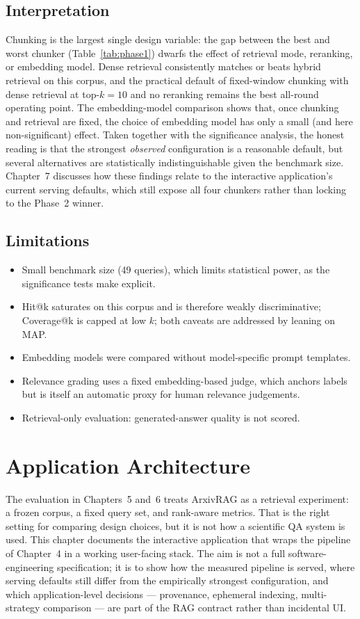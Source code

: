 \documentclass[12pt,a4paper,titlepage,oneside]{book}
\begin{document}
\section{Interpretation}
Chunking is the largest single design variable: the gap between the best and worst chunker (Table~\ref{tab:phase1}) dwarfs the effect of retrieval mode, reranking, or embedding model. Dense retrieval consistently matches or beats hybrid retrieval on this corpus, and the practical default of fixed-window chunking with dense retrieval at top-$k=10$ and no reranking remains the best all-round operating point. The embedding-model comparison shows that, once chunking and retrieval are fixed, the choice of embedding model has only a small (and here non-significant) effect. Taken together with the significance analysis, the honest reading is that the strongest \emph{observed} configuration is a reasonable default, but several alternatives are statistically indistinguishable given the benchmark size. Chapter~7 discusses how these findings relate to the interactive application's current serving defaults, which still expose all four chunkers rather than locking to the Phase~2 winner.

\section{Limitations}
\begin{itemize}
    \item Small benchmark size (49 queries), which limits statistical power, as the significance tests make explicit.
    \item Hit@k saturates on this corpus and is therefore weakly discriminative; Coverage@k is capped at low $k$; both caveats are addressed by leaning on MAP.
    \item Embedding models were compared without model-specific prompt templates.
    \item Relevance grading uses a fixed embedding-based judge, which anchors labels but is itself an automatic proxy for human relevance judgements.
    \item Retrieval-only evaluation: generated-answer quality is not scored.
\end{itemize}

\chapter{Application Architecture}

The evaluation in Chapters~5 and~6 treats ArxivRAG as a retrieval experiment: a frozen corpus, a fixed query set, and rank-aware metrics. That is the right setting for comparing design choices, but it is not how a scientific QA system is used. This chapter documents the interactive application that wraps the pipeline of Chapter~4 in a working user-facing stack. The aim is not a full software-engineering specification; it is to show how the measured pipeline is served, where serving defaults still differ from the empirically strongest configuration, and which application-level decisions --- provenance, ephemeral indexing, multi-strategy comparison --- are part of the RAG contract rather than incidental UI.
\end{document}
